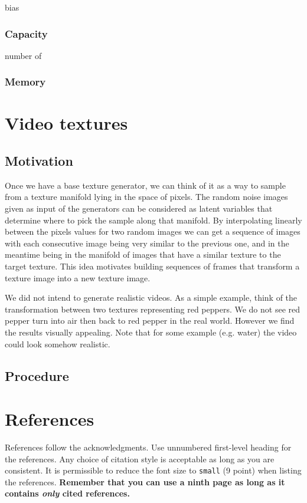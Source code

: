 \documentclass{article}
\begin{document}
bias

\subsubsection{Capacity}

number of 

\subsubsection{Memory}

\section{Video textures}

\subsection{Motivation}
Once we have a base texture generator, we can think of it as a way to sample from a texture manifold lying in the space of pixels. The random noise images given as input of the generators can be considered as latent variables that determine where to pick the sample along that manifold. By interpolating linearly between the pixels values for two random images we can get a sequence of images with each consecutive image being very similar to the previous one, and in the meantime being in the manifold of images that have a similar texture to the target texture. This idea motivates building sequences of frames that transform a texture image into a new texture image.

We did not intend to generate realistic videos. As a simple example, think of the transformation between two textures representing red peppers. We do not see red pepper turn into air then back to red pepper in the real world. However we find the results visually appealing. Note that for some example (e.g. water) the video could look somehow realistic.

\subsection{Procedure}

\section*{References}

References follow the acknowledgments. Use unnumbered first-level
heading for the references. Any choice of citation style is acceptable
as long as you are consistent. It is permissible to reduce the font
size to \verb+small+ (9 point) when listing the references. {\bf
  Remember that you can use a ninth page as long as it contains
  \emph{only} cited references.}
\medskip
\end{document}
